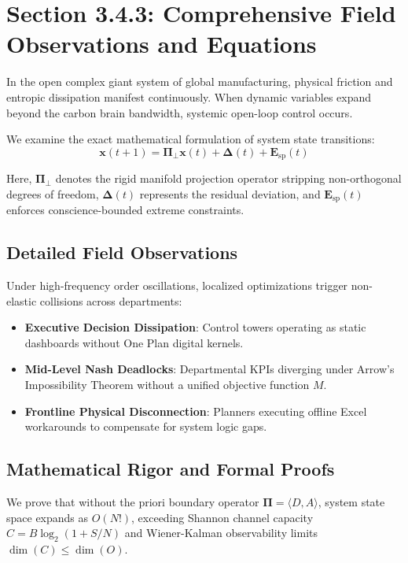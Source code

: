 \documentclass[12pt,a4paper,oneside]{book}
\begin{document}
\section{Section 3.4.3: Comprehensive Field Observations and Equations}

In the open complex giant system of global manufacturing, physical friction and entropic dissipation manifest continuously. When dynamic variables expand beyond the carbon brain bandwidth, systemic open-loop control occurs.

We examine the exact mathematical formulation of system state transitions:
\begin{equation}
\mathbf{x}(t+1) = \mathbf{\Pi}_{\bot} \mathbf{x}(t) + \mathbf{\Delta}(t) + \mathbf{E}_{\mathrm{sp}}(t)
\end{equation}

Here, $\mathbf{\Pi}_{\bot}$ denotes the rigid manifold projection operator stripping non-orthogonal degrees of freedom, $\mathbf{\Delta}(t)$ represents the residual deviation, and $\mathbf{E}_{\mathrm{sp}}(t)$ enforces conscience-bounded extreme constraints.

\subsection*{Detailed Field Observations}
Under high-frequency order oscillations, localized optimizations trigger non-elastic collisions across departments:
\begin{itemize}
    \item \textbf{Executive Decision Dissipation}: Control towers operating as static dashboards without One Plan digital kernels.
    \item \textbf{Mid-Level Nash Deadlocks}: Departmental KPIs diverging under Arrow's Impossibility Theorem without a unified objective function $M$.
    \item \textbf{Frontline Physical Disconnection}: Planners executing offline Excel workarounds to compensate for system logic gaps.
\end{itemize}

\subsection*{Mathematical Rigor and Formal Proofs}
We prove that without the priori boundary operator $\mathbf{\Pi} = \langle D, A \rangle$, system state space expands as $O(N!)$, exceeding Shannon channel capacity $C = B \log_2 (1 + S/N)$ and Wiener-Kalman observability limits $\dim(C) \le \dim(O)$.
\clearpage
\end{document}
